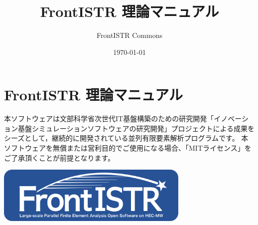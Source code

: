 \documentclass[a4paper,pandoc,ja=standard]{bxjsarticle}
\title{FrontISTR 理論マニュアル}
\author{FrontISTR Commons}
\date{\today}
\begin{document}
\maketitle

{
\setcounter{tocdepth}{3}
\tableofcontents
}
\hypertarget{frontistr-ux7406ux8ad6ux30deux30cbux30e5ux30a2ux30eb}{%
\section{FrontISTR 理論マニュアル}\label{frontistr-ux7406ux8ad6ux30deux30cbux30e5ux30a2ux30eb}}

本ソフトウェアは文部科学省次世代IT基盤構築のための研究開発「イノベーション基盤シミュレーションソフトウェアの研究開発」プロジェクトによる成果をシーズとして，継続的に開発されている並列有限要素解析プログラムです。
本ソフトウェアを無償または営利目的でご使用になる場合、「MITライセンス」をご了承頂くことが前提となります。

\href{https://www.frontistr.com}{\includegraphics[width=3.64583in,height=\textheight]{../image/FrontISTR_logo.png}}
\end{document}
